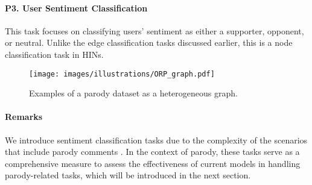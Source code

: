 \paragraph{P3. User Sentiment Classification} This task focuses on classifying users' sentiment as either a \textcolor{pos}{supporter}, \textcolor{neg}{opponent}, or \textcolor{neu}{neutral}. Unlike the edge classification tasks discussed earlier, this is a node classification task in HINs.

\begin{figure*}[htbp]
\centering
  \texttt{[image: images/illustrations/ORP\_graph.pdf]}
  \caption{Examples of a parody dataset as a heterogeneous graph.}\vspace{-0.4cm}
  \label{fig:ORP_graph}
\end{figure*}

\paragraph{Remarks} We introduce sentiment classification tasks due to the complexity of the scenarios that include parody comments \cite{bull2010automatic}. In the context of parody, these tasks serve as a comprehensive measure to assess the effectiveness of current models in handling parody-related tasks, which will be introduced in the next section.


